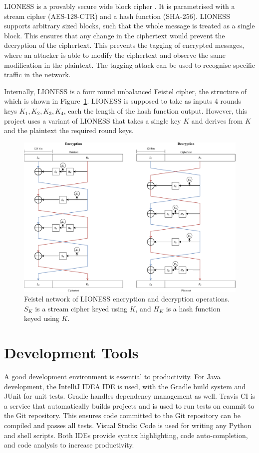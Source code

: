 \documentclass[final,dissertation.tex]{subfiles}
\begin{document}
LIONESS is a provably secure wide block cipher \cite{anderson1996two}. It is parametrised with a stream cipher (AES-128-CTR) and a hash function (SHA-256). LIONESS supports arbitrary sized blocks, such that the whole message is treated as a single block. This ensures that any change in the ciphertext would prevent the decryption of the ciphertext. This prevents the tagging of encrypted messages, where an attacker is able to modify the ciphertext and observe the same modification in the plaintext. The tagging attack can be used to recognise specific traffic in the network.

Internally, LIONESS is a four round unbalanced Feistel cipher, the structure of which is shown in Figure~\ref{fig:lioness_feistel}. LIONESS is supposed to take as inputs 4 rounds keys $K_1, K_2, K_3, K_4$, each the length of the hash function output. However, this project uses a variant of LIONESS that takes a single key $K$ and derives from $K$ and the plaintext the required round keys.

\begin{figure}[h]
	\includegraphics[width=\linewidth]{../figs/lioness_feistel}
	\caption{Feistel network of LIONESS encryption and decryption operations. $S_K$ is a stream cipher keyed using $K$, and $H_K$ is a hash function keyed using $K$.}
	\label{fig:lioness_feistel}
\end{figure}

\section{Development Tools}

A good development environment is essential to productivity. For Java development, the IntelliJ IDEA IDE is used, with the Gradle build system and JUnit for unit tests. Gradle handles dependency management as well. Travis CI is a service that automatically builds projects and is used to run tests on commit to the Git repository. This ensures code committed to the Git repository can be compiled and passes all tests. Visual Studio Code is used for writing any Python and shell scripts. Both IDEs provide syntax highlighting, code auto-completion, and code analysis to increase productivity.
\end{document}

